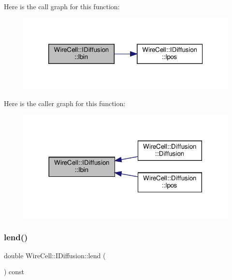 Here is the call graph for this function\+:
\nopagebreak
\begin{figure}[H]
\begin{center}
\leavevmode
\includegraphics[width=320pt]{class_wire_cell_1_1_i_diffusion_ac82a15088681538902392c880666aa3e_cgraph}
\end{center}
\end{figure}
Here is the caller graph for this function\+:
\nopagebreak
\begin{figure}[H]
\begin{center}
\leavevmode
\includegraphics[width=317pt]{class_wire_cell_1_1_i_diffusion_ac82a15088681538902392c880666aa3e_icgraph}
\end{center}
\end{figure}
\mbox{\label{class_wire_cell_1_1_i_diffusion_a1016b2629bf19ceb69815200d5f1480f}} 
\subsubsection{\texorpdfstring{lend()}{lend()}}
{\footnotesize\ttfamily double Wire\+Cell\+::\+I\+Diffusion\+::lend (\begin{DoxyParamCaption}{ }\end{DoxyParamCaption}) const\hspace{0.3cm}{\ttfamily [inline]}}



